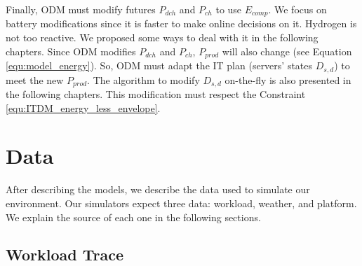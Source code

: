Finally, ODM must modify futures $P_{dch}$ and $P_{ch}$ to use $E_{comp}$. We focus on battery modifications since it is faster to make online decisions on it. Hydrogen is not too reactive. We proposed some ways to deal with it in the following chapters. Since ODM modifies $P_{dch}$ and $P_{ch}$, $P_{prod}$ will also change (see Equation \ref{equ:model_energy}). So, ODM must adapt the IT plan (servers' states $D_{s,d}$) to meet the new $P_{prod}$. The algorithm to modify $D_{s,d}$ on-the-fly is also presented in the following chapters. This modification must respect the Constraint \ref{equ:ITDM_energy_less_envelope}.

\section{Data}
After describing the models, we describe the data used to simulate our environment. Our simulators expect three data: workload, weather, and platform. We explain the source of each one in the following sections. 

\subsection{Workload Trace}
\label{sec:workload_trace}

